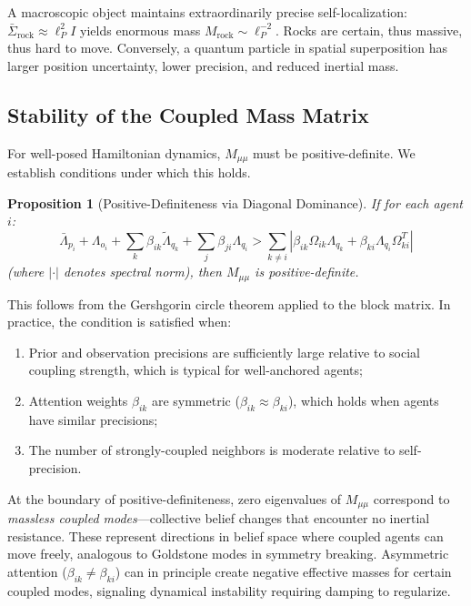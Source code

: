 \documentclass[11pt]{article}
\newtheorem{proposition}{Proposition}
\begin{document}
A macroscopic object maintains extraordinarily precise self-localization: $\bar{\Sigma}_{\mathrm{rock}} \approx \ell_P^2 I$ yields enormous mass $M_{\mathrm{rock}} \sim \ell_P^{-2}$. Rocks are certain, thus massive, thus hard to move. Conversely, a quantum particle in spatial superposition has larger position uncertainty, lower precision, and reduced inertial mass.

\subsection{Stability of the Coupled Mass Matrix}
\label{sec:stability}

For well-posed Hamiltonian dynamics, $M_{\mu\mu}$ must be positive-definite. We establish conditions under which this holds.

\begin{proposition}[Positive-Definiteness via Diagonal Dominance]
If for each agent $i$:
\begin{equation}
\bar{\Lambda}_{p_i} + \Lambda_{o_i} + \sum_k\beta_{ik}\tilde{\Lambda}_{q_k} + \sum_j\beta_{ji}\Lambda_{q_i} > \sum_{k \neq i}\left|\beta_{ik}\Omega_{ik}\Lambda_{q_k} + \beta_{ki}\Lambda_{q_i}\Omega_{ki}^T\right|
\end{equation}
(where $|\cdot|$ denotes spectral norm), then $M_{\mu\mu}$ is positive-definite.
\end{proposition}

This follows from the Gershgorin circle theorem applied to the block matrix. In practice, the condition is satisfied when:
\begin{enumerate}
\item Prior and observation precisions are sufficiently large relative to social coupling strength, which is typical for well-anchored agents;
\item Attention weights $\beta_{ik}$ are symmetric ($\beta_{ik} \approx \beta_{ki}$), which holds when agents have similar precisions;
\item The number of strongly-coupled neighbors is moderate relative to self-precision.
\end{enumerate}

At the boundary of positive-definiteness, zero eigenvalues of $M_{\mu\mu}$ correspond to \emph{massless coupled modes}---collective belief changes that encounter no inertial resistance. These represent directions in belief space where coupled agents can move freely, analogous to Goldstone modes in symmetry breaking. Asymmetric attention ($\beta_{ik} \neq \beta_{ki}$) can in principle create negative effective masses for certain coupled modes, signaling dynamical instability requiring damping to regularize.
\end{document}
